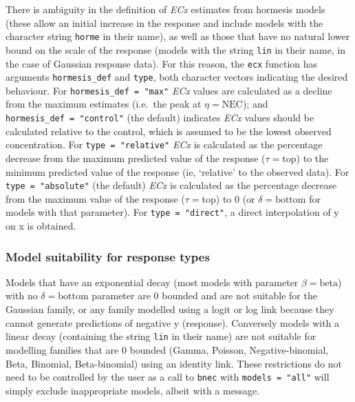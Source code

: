 \documentclass[
]{jss}
\begin{document}
There is ambiguity in the definition of \emph{ECx} estimates from
hormesis models (these allow an initial increase in the response
\citep[see][]{Mattson2008} and include models with the character string
\texttt{horme} in their name), as well as those that have no natural
lower bound on the scale of the response (models with the string
\texttt{lin} in their name, in the case of Gaussian response data). For
this reason, the \texttt{ecx} function has arguments
\texttt{hormesis\_def} and \texttt{type}, both character vectors
indicating the desired behaviour. For \texttt{hormesis\_def\ =\ "max"}
\emph{ECx} values are calculated as a decline from the maximum estimates
(i.e.~the peak at \(\eta = \text{NEC}\)); and
\texttt{hormesis\_def\ =\ "control"} (the default) indicates \emph{ECx}
values should be calculated relative to the control, which is assumed to
be the lowest observed concentration. For \texttt{type\ =\ "relative"}
\emph{ECx} is calculated as the percentage decrease from the maximum
predicted value of the response (\(\tau = \text{top}\)) to the minimum
predicted value of the response (ie, `relative' to the observed data).
For \texttt{type\ =\ "absolute"} (the default) \emph{ECx} is calculated
as the percentage decrease from the maximum value of the response
(\(\tau = \text{top}\)) to 0 (or \(\delta = \text{bottom}\) for models
with that parameter). For \texttt{type\ =\ "direct"}, a direct
interpolation of y on x is obtained.

\hypertarget{model-suitability-for-response-types}{%
\subsubsection{Model suitability for response
types}\label{model-suitability-for-response-types}}

Models that have an exponential decay (most models with parameter
\(\beta = \text{beta}\)) with no \(\delta = \text{bottom}\) parameter
are 0 bounded and are not suitable for the Gaussian family, or any
family modelled using a logit or log link because they cannot generate
predictions of negative y (response). Conversely models with a linear
decay (containing the string \texttt{lin} in their name) are not
suitable for modelling families that are 0 bounded (Gamma, Poisson,
Negative-binomial, Beta, Binomial, Beta-binomial) using an identity
link. These restrictions do not need to be controlled by the user as a
call to \texttt{bnec} with \texttt{models\ =\ "all"} will simply exclude
inappropriate models, albeit with a message.
\end{document}
